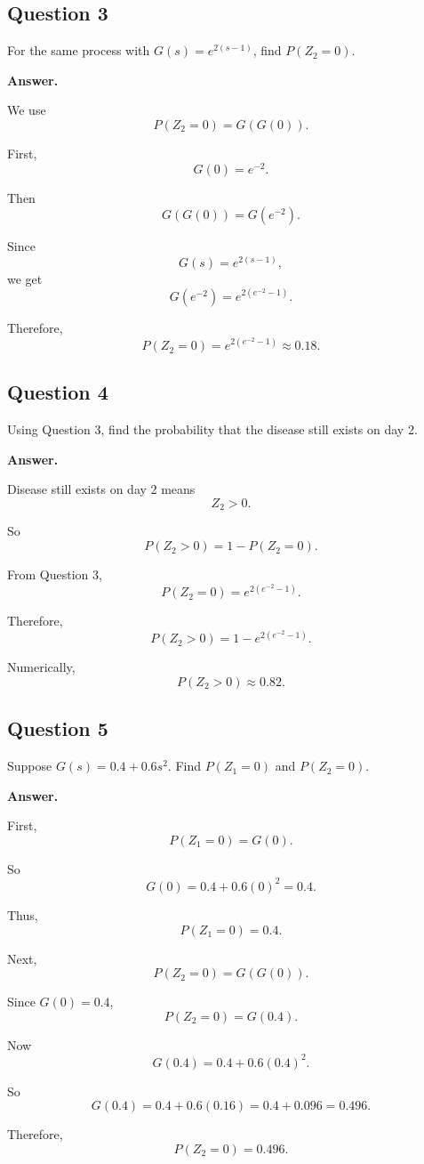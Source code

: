 \documentclass[12pt]{article}
\begin{document}
\subsection*{Question 3}

For the same process with \(G(s)=e^{2(s-1)}\), find \(P(Z_2=0)\).

\textbf{Answer.}

We use
\[
P(Z_2=0)=G(G(0)).
\]

First,
\[
G(0)=e^{-2}.
\]

Then
\[
G(G(0))=G(e^{-2}).
\]

Since
\[
G(s)=e^{2(s-1)},
\]
we get
\[
G(e^{-2})=e^{2(e^{-2}-1)}.
\]

Therefore,
\[
\boxed{P(Z_2=0)=e^{2(e^{-2}-1)}\approx 0.18.}
\]

\subsection*{Question 4}

Using Question 3, find the probability that the disease still exists on day 2.

\textbf{Answer.}

Disease still exists on day 2 means
\[
Z_2>0.
\]

So
\[
P(Z_2>0)=1-P(Z_2=0).
\]

From Question 3,
\[
P(Z_2=0)=e^{2(e^{-2}-1)}.
\]

Therefore,
\[
P(Z_2>0)=1-e^{2(e^{-2}-1)}.
\]

Numerically,
\[
\boxed{P(Z_2>0)\approx 0.82.}
\]

\subsection*{Question 5}

Suppose \(G(s)=0.4+0.6s^2\). Find \(P(Z_1=0)\) and \(P(Z_2=0)\).

\textbf{Answer.}

First,
\[
P(Z_1=0)=G(0).
\]

So
\[
G(0)=0.4+0.6(0)^2=0.4.
\]

Thus,
\[
\boxed{P(Z_1=0)=0.4.}
\]

Next,
\[
P(Z_2=0)=G(G(0)).
\]

Since \(G(0)=0.4\),
\[
P(Z_2=0)=G(0.4).
\]

Now
\[
G(0.4)=0.4+0.6(0.4)^2.
\]

So
\[
G(0.4)=0.4+0.6(0.16)=0.4+0.096=0.496.
\]

Therefore,
\[
\boxed{P(Z_2=0)=0.496.}
\]
\end{document}
